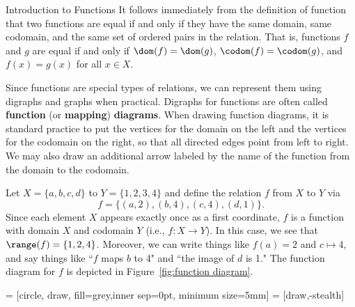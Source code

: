 \begin{section}{Introduction to Functions}
It follows immediately from the definition of function that two functions are equal if and only if they have the same domain, same codomain, and the same set of ordered pairs in the relation. That is, functions $f$ and $g$ are equal if and only if $\dom(f)=\dom(g)$, $\codom(f)=\codom(g)$, and $f(x)=g(x)$ for all $x\in X$.

Since functions are special types of relations, we can represent them using digraphs and graphs when practical. Digraphs for functions are often called \textbf{function} (or \textbf{mapping}) \textbf{diagrams}. When drawing function diagrams, it is standard practice to put the vertices for the domain on the left and the vertices for the codomain on the right, so that all directed edges point from left to right. We may also draw an additional arrow labeled by the name of the function from the domain to the codomain.

\begin{example}\label{ex:function}
Let $X=\{a,b,c,d\}$ to $Y=\{1,2,3,4\}$ and define the relation $f$ from $X$ to $Y$ via
\[
f=\{(a,2),(b,4),(c,4),(d,1)\}.
\]
Since each element $X$ appears exactly once as a first coordinate, $f$ is a function with domain $X$ and codomain $Y$ (i.e., $f:X\to Y$). In this case, we see that $\range(f)=\{1,2,4\}$.  Moreover, we can write things like $f(a)=2$ and $c\mapsto 4$, and say things like ``$f$ maps $b$ to 4" and ``the image of $d$ is 1."  The function diagram for $f$ is depicted in Figure~\ref{fig:function diagram}.
\end{example}

 = [circle, draw, fill=grey,inner sep=0pt, minimum size=5mm]
 = [draw,-stealth]

\begin{figure}[h!]
\begin{center}
\end{center}
\end{figure}
\end{section}

